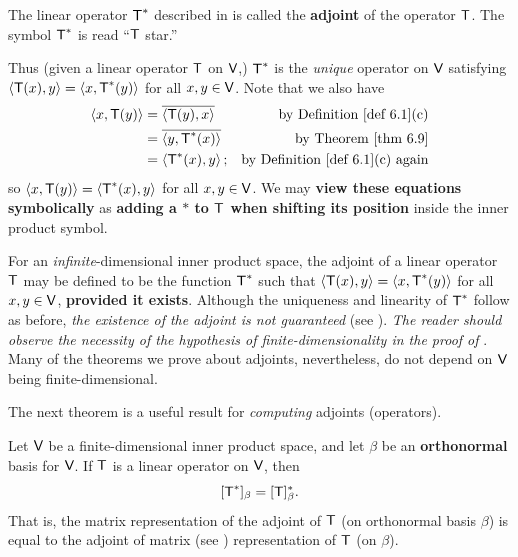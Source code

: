 \begin{additional definition} \label{adef 6.4}
The linear operator \(\textsf{T}^*\) described in  is called the \textbf{adjoint} of the operator \(\textsf{T}\).
The symbol \(\textsf{T}^*\) is read ``\(\textsf{T}\) star.''
\end{additional definition}

\begin{remark} \label{remark 6.3.2}
Thus (given a linear operator \(\textsf{T}\) on \(\textsf{V}\),) \(\textsf{T}^*\) is the \emph{unique} operator on \(\textsf{V}\) satisfying \(\left< \textsf{T}(x), y \right> = \left< x, \textsf{T}^*(y) \right>\) for all \(x, y \in \textsf{V}\).
Note that we also have
\begin{align*}
    \LG x, \T(y) \RG & = \conjugatet{\LG \T(y), x \RG} & \text{by \DEF{6.1}(c)} \\
    & = \conjugatet{\LG y, \T^*(x) \RG} & \text{by \THM{6.9}} \\
    & = \LG \T^*(x), y \RG; & \text{by \DEF{6.1}(c) again}
\end{align*}
so \(\left< x, \textsf{T}(y) \right> = \left< \textsf{T}^*(x), y \right>\) for all \(x, y \in \textsf{V}\).
We may \textbf{view these equations symbolically} as \textbf{adding a \(*\) to \(\textsf{T}\) when shifting its position} inside the inner product symbol.
\end{remark}

\begin{remark} \label{remark 6.3.3}
For an \emph{infinite}-dimensional inner product space, the adjoint of a linear operator \(\textsf{T}\) may be defined to be the function \(\textsf{T}^*\) such that \(\left< \textsf{T}(x), y \right> = \left< x, \textsf{T}^*(y) \right>\) for all \(x, y \in \textsf{V}\), \textbf{provided it exists}.
Although the uniqueness and linearity of \(\textsf{T}^*\) follow as before, \emph{the existence of the adjoint is not guaranteed} (see ).
\textit{The reader should observe the necessity of the hypothesis of finite-dimensionality in the proof of }.
Many of the theorems we prove about adjoints, nevertheless, do not depend on \(\textsf{V}\) being finite-dimensional.
\end{remark}

The next theorem is a useful result for \emph{computing} adjoints (operators).

\begin{theorem} \label{thm 6.10}
Let \(\textsf{V}\) be a finite-dimensional inner product space, and let \(\beta\) be an \textbf{orthonormal} basis for \(\textsf{V}\).
If \(\textsf{T}\) is a linear operator on \(\textsf{V}\), then
\[
    [\textsf{T}^*]_{\beta} = [\textsf{T}]^*_{\beta}.
\]
That is, the matrix representation of the adjoint of \(\textsf{T}\) (on orthonormal basis \(\beta\)) is equal to the adjoint of matrix (see ) representation of \(\textsf{T}\) (on \(\beta\)).
\end{theorem}

